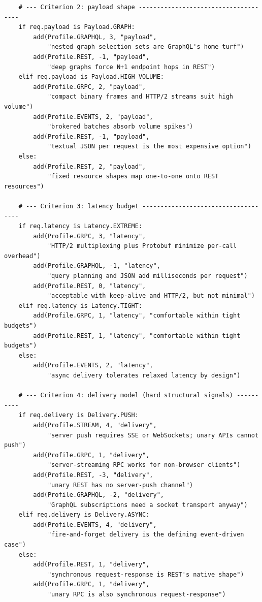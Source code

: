 \begin{verbatim}
    # --- Criterion 2: payload shape -------------------------------------
    if req.payload is Payload.GRAPH:
        add(Profile.GRAPHQL, 3, "payload",
            "nested graph selection sets are GraphQL's home turf")
        add(Profile.REST, -1, "payload",
            "deep graphs force N+1 endpoint hops in REST")
    elif req.payload is Payload.HIGH_VOLUME:
        add(Profile.GRPC, 2, "payload",
            "compact binary frames and HTTP/2 streams suit high volume")
        add(Profile.EVENTS, 2, "payload",
            "brokered batches absorb volume spikes")
        add(Profile.REST, -1, "payload",
            "textual JSON per request is the most expensive option")
    else:
        add(Profile.REST, 2, "payload",
            "fixed resource shapes map one-to-one onto REST resources")

    # --- Criterion 3: latency budget ------------------------------------
    if req.latency is Latency.EXTREME:
        add(Profile.GRPC, 3, "latency",
            "HTTP/2 multiplexing plus Protobuf minimize per-call overhead")
        add(Profile.GRAPHQL, -1, "latency",
            "query planning and JSON add milliseconds per request")
        add(Profile.REST, 0, "latency",
            "acceptable with keep-alive and HTTP/2, but not minimal")
    elif req.latency is Latency.TIGHT:
        add(Profile.GRPC, 1, "latency", "comfortable within tight budgets")
        add(Profile.REST, 1, "latency", "comfortable within tight budgets")
    else:
        add(Profile.EVENTS, 2, "latency",
            "async delivery tolerates relaxed latency by design")

    # --- Criterion 4: delivery model (hard structural signals) ----------
    if req.delivery is Delivery.PUSH:
        add(Profile.STREAM, 4, "delivery",
            "server push requires SSE or WebSockets; unary APIs cannot push")
        add(Profile.GRPC, 1, "delivery",
            "server-streaming RPC works for non-browser clients")
        add(Profile.REST, -3, "delivery",
            "unary REST has no server-push channel")
        add(Profile.GRAPHQL, -2, "delivery",
            "GraphQL subscriptions need a socket transport anyway")
    elif req.delivery is Delivery.ASYNC:
        add(Profile.EVENTS, 4, "delivery",
            "fire-and-forget delivery is the defining event-driven case")
    else:
        add(Profile.REST, 1, "delivery",
            "synchronous request-response is REST's native shape")
        add(Profile.GRPC, 1, "delivery",
            "unary RPC is also synchronous request-response")


\end{verbatim}
